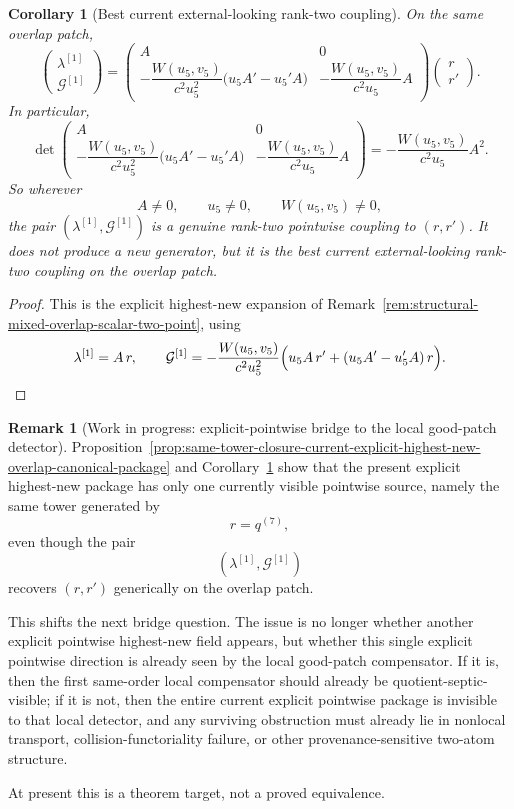 \documentclass[11pt,a4paper]{amsart}
\theoremstyle{plain}
\newtheorem{corollary}[theorem]{Corollary}
\theoremstyle{definition}
\newtheorem{remark}[theorem]{Remark}
\begin{document}
\begin{corollary}[Best current external-looking rank-two coupling]
\label{cor:best-current-external-rank-two-coupling-overlap}
On the same overlap patch,
\[
\begin{pmatrix}
\lambda^{[1]}\\[2pt]
\mathcal G^{[1]}
\end{pmatrix}
=
\begin{pmatrix}
A & 0\\[4pt]
-\dfrac{W(u_5,v_5)}{c^2u_5^2}\bigl(u_5A'-u_5'A\bigr)
&
-\dfrac{W(u_5,v_5)}{c^2u_5}A
\end{pmatrix}
\begin{pmatrix}
r\\[2pt]
r'
\end{pmatrix}.
\]
In particular,
\[
\det
\begin{pmatrix}
A & 0\\[4pt]
-\dfrac{W(u_5,v_5)}{c^2u_5^2}\bigl(u_5A'-u_5'A\bigr)
&
-\dfrac{W(u_5,v_5)}{c^2u_5}A
\end{pmatrix}
=
-\frac{W(u_5,v_5)}{c^2u_5}A^2.
\]
So wherever
\[
A\neq 0,
\qquad
u_5\neq 0,
\qquad
W(u_5,v_5)\neq 0,
\]
the pair $(\lambda^{[1]},\mathcal G^{[1]})$ is a genuine rank-two pointwise
coupling to $(r,r')$. It does not produce a new generator, but it is the best
current external-looking rank-two coupling on the overlap patch.
\end{corollary}

\begin{proof}
This is the explicit highest-new expansion of
Remark~\ref{rem:structural-mixed-overlap-scalar-two-point}, using
\[
\lambda^{[1]}=A\,r,
\qquad
\mathcal G^{[1]}
=
-\frac{W(u_5,v_5)}{c^2u_5^2}
\Bigl(u_5A\,r'+(u_5A'-u_5'A)\,r\Bigr).
\]
\end{proof}

\begin{remark}[Work in progress: explicit-pointwise bridge to the local good-patch detector]
\label{rem:wip-explicit-pointwise-bridge-good-patch-detector}
Proposition~\ref{prop:same-tower-closure-current-explicit-highest-new-overlap-canonical-package}
and
Corollary~\ref{cor:best-current-external-rank-two-coupling-overlap}
show that the present explicit highest-new package has only one currently
visible pointwise source, namely the same tower generated by
\[
r=q^{(7)},
\]
even though the pair
\[
(\lambda^{[1]},\mathcal G^{[1]})
\]
recovers $(r,r')$ generically on the overlap patch.

This shifts the next bridge question. The issue is no longer whether another
explicit pointwise highest-new field appears, but whether this single explicit
pointwise direction is already seen by the local good-patch compensator. If it
is, then the first same-order local compensator should already be
quotient-septic-visible; if it is not, then the entire current explicit
pointwise package is invisible to that local detector, and any surviving
obstruction must already lie in nonlocal transport,
collision-functoriality failure, or other provenance-sensitive two-atom
structure.

At present this is a theorem target, not a proved equivalence.
\end{remark}
\end{document}
